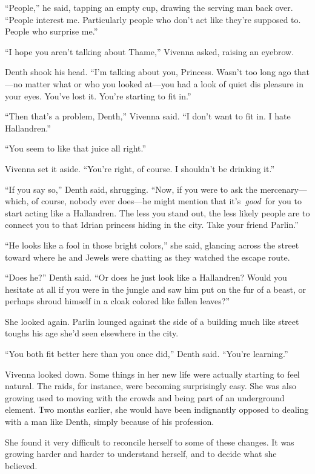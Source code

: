 “People,” he said, tapping an empty cup, drawing the serving man back over. “People interest me. Particularly people who don’t act like they’re supposed to. People who surprise me.”

“I hope you aren’t talking about Thame,” Vivenna asked, raising an eyebrow.

Denth shook his head. “I’m talking about you, Princess. Wasn’t too long ago that—no matter what or who you looked at—you had a look of quiet dis pleasure in your eyes. You’ve lost it. You’re starting to fit in.”

“Then that’s a problem, Denth,” Vivenna said. “I don’t want to fit in. I hate Hallandren.”

“You seem to like that juice all right.”

Vivenna set it aside. “You’re right, of course. I shouldn’t be drinking it.”

“If you say so,” Denth said, shrugging. “Now, if you were to ask the mercenary—which, of course, nobody ever does—he might mention that it’s~\textit{good}~for you to start acting like a Hallandren. The less you stand out, the less likely people are to connect you to that Idrian princess hiding in the city. Take your friend Parlin.”

“He looks like a fool in those bright colors,” she said, glancing across the street toward where he and Jewels were chatting as they watched the escape route.

“Does he?” Denth said. “Or does he just look like a Hallandren? Would you hesitate at all if you were in the jungle and saw him put on the fur of a beast, or perhaps shroud himself in a cloak colored like fallen leaves?”

She looked again. Parlin lounged against the side of a building much like street toughs his age she’d seen elsewhere in the city.

“You both fit better here than you once did,” Denth said. “You’re learning.”

Vivenna looked down. Some things in her new life were actually starting to feel natural. The raids, for instance, were becoming surprisingly easy. She was also growing used to moving with the crowds and being part of an underground element. Two months earlier, she would have been indignantly opposed to dealing with a man like Denth, simply because of his profession.

She found it very difficult to reconcile herself to some of these changes. It was growing harder and harder to understand herself, and to decide what she believed.

